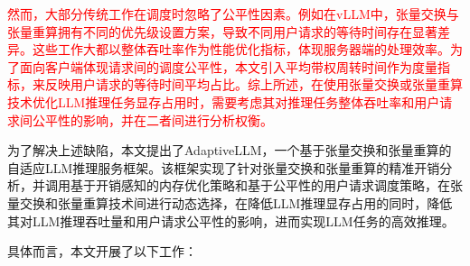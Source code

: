 
\textcolor{red}{然而，大部分传统工作在调度时忽略了公平性因素。例如在vLLM中，张量交换与张量重算拥有不同的优先级设置方案，导致不同用户请求的等待时间存在显著差异。这些工作大都以整体吞吐率作为性能优化指标，体现服务器端的处理效率。为了面向客户端体现请求间的调度公平性，本文引入平均带权周转时间作为度量指标，来反映用户请求的等待时间平均占比。综上所述，在使用张量交换或张量重算技术优化LLM推理任务显存占用时，需要考虑其对推理任务整体吞吐率和用户请求间公平性的影响，并在二者间进行分析权衡。}

为了解决上述缺陷，本文提出了AdaptiveLLM，一个基于张量交换和张量重算的自适应LLM推理服务框架。该框架实现了针对张量交换和张量重算的精准开销分析，并调用基于开销感知的内存优化策略和基于公平性的用户请求调度策略，在张量交换和张量重算技术间进行动态选择，在降低LLM推理显存占用的同时，降低其对LLM推理吞吐量和用户请求公平性的影响，进而实现LLM任务的高效推理。

具体而言，本文开展了以下工作：

